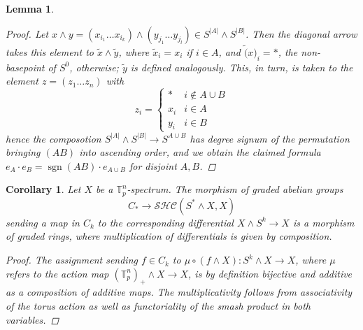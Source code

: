 \documentclass[10pt, a4paper, UKenglish]{article}
\numberwithin{equation}{section}
\newcommand{\sT}{\mathbb{T}}		%
\newcommand{\abs}[1]{\left\vert#1\right\vert}	%
\newcommand{\SHC}{\mathcal{SHC}}
\newcommand{\sgn}{\operatorname{sgn}}
\theoremstyle{plain}
\newtheorem{lem}[equation]{Lemma}
\newtheorem{cor}[equation]{Corollary}
\theoremstyle{definition}
\renewcommand{\to}{\longrightarrow}
\begin{document}
\begin{lem}
\begin{proof}
Let $x \wedge y = (x_{i_1} \ldots x_{i_k}) \wedge (y_{j_1} \ldots y_{j_l}) \in S^{\abs{A}} \wedge S^{\abs{B}}$. Then the diagonal arrow takes this element to $ \tilde{x} \wedge \tilde{y}$, where $\tilde{x}_i = x_i$ if $i \in A$, and $\tilde(x)_i = \ast$, the non-basepoint of $S^0$, otherwise; $\tilde{y}$ is defined analogously. This, in turn, is taken to the element $z = (z_1 \ldots z_n)$ with
\[ z_i = \left\{
		\begin{array}{ll}
			\ast & i \nin A \cup B \\
			x_i & i \in A \\
			y_i & i \in B
		\end{array}
	\right.\]
hence the composotion $S^{\abs{A}} \wedge S^{\abs{B}} \to S^{A \cup B}$ has degree signum of the permutation bringing $(AB)$ into ascending order, and we obtain the claimed formula $e_A \cdot e_B = \sgn{(AB)} \cdot e_{A \cup B}$ for disjoint $A,B$.
\end{proof}
\end{lem}
%
%
\begin{cor}\label{cor_diffs_ext_alg}
Let $X$ be a $\sT_p^n$-spectrum. The morphism of graded abelian groups%
  \[C_* \to \SHC(S^* \wedge X, X)\]%
sending a map in $C_k$ to the corresponding differential $X \wedge S^k \to X$ is a morphism of graded rings, where multiplication of differentials is given by composition.
\begin{proof}
The assignment sending $f \in C_k$ to $\mu \circ (f \wedge X):S^k \wedge X \to X$, where $\mu$ refers to the action map $(\sT_p^n)_+ \wedge X \to X$, is by definition bijective and additive as a composition of additive maps. The multiplicativity follows from associativity of the torus action as well as functoriality of the smash product in both variables.
\end{proof}
\end{cor}
%
%
\end{document}
